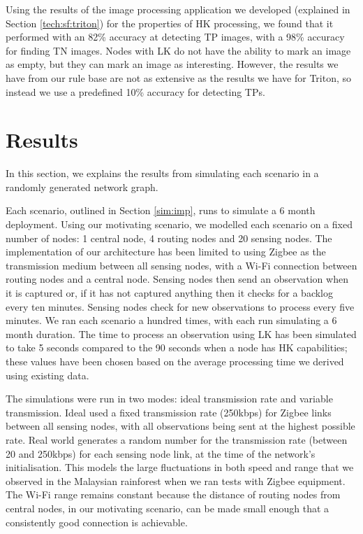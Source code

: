 	Using the results of the image processing application we developed (explained in Section \ref{tech:sf:triton}) for the properties of HK processing, we found that it performed with an 82\% accuracy at detecting TP images, with a 98\% accuracy for finding TN images. Nodes with LK do not have the ability to mark an image as empty, but they can mark an image as interesting. However, the results we have from our rule base are not as extensive as the results we have for Triton, so instead we use a predefined 10\% accuracy for detecting TPs.
	

\section{Results}
In this section, we explains the results from simulating each scenario in a randomly generated network graph. 

Each scenario, outlined in Section \ref{sim:imp}, runs to simulate a 6 month deployment. Using our motivating scenario, we modelled each scenario on a fixed number of nodes: 1 central node, 4 routing nodes and 20 sensing nodes. The implementation of our architecture has been limited to using Zigbee as the transmission medium between all sensing nodes, with a Wi-Fi connection between routing nodes and a central node. Sensing nodes then send an observation when it is captured or, if it has not captured anything then it checks for a backlog every ten minutes. Sensing nodes check for new observations to process every five minutes. We ran each scenario a hundred times, with each run simulating a 6 month duration. The time to process an observation using LK has been simulated to take 5 seconds compared to the 90 seconds when a node has HK capabilities; these values have been chosen based on the average processing time we derived using existing data. 

The simulations were run in two modes: ideal transmission rate and variable transmission. Ideal used a fixed transmission rate (250kbps) for Zigbee links between all sensing nodes, with all observations being sent at the highest possible rate. Real world generates a random number for the transmission rate (between 20 and 250kbps) for each sensing node link, at the time of the network's initialisation. This models the large fluctuations in both speed and range that we observed in the Malaysian rainforest when we ran tests with Zigbee equipment. The Wi-Fi range remains constant because the distance of routing nodes from central nodes, in our motivating scenario, can be made small enough that a consistently good connection is achievable.


